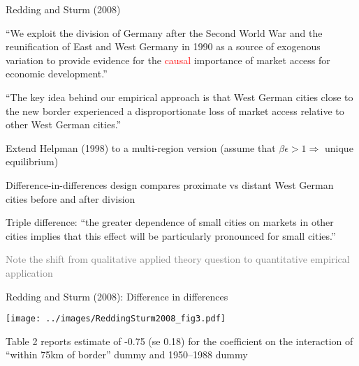 \documentclass[11pt,notes=hide,aspectratio=169]{beamer}
\begin{document}
\begin{frame}{Redding and Sturm (2008)}
\begin{itemize}
{\small
	\item ``We exploit the division of Germany after the Second World War and the reunification of East and West Germany in 1990 as a source of exogenous variation to provide evidence for the \textcolor{red}{causal} importance of market access for economic development.''
	\item ``The key idea behind our empirical approach is that West German cities close to the new border experienced a disproportionate loss of market access relative to other West German cities.''
	\item Extend Helpman (1998) to a multi-region version (assume that $\beta\epsilon>1 \Rightarrow$ unique equilibrium)
	\item Difference-in-differences design compares proximate vs distant West German cities before and after division
	\item Triple difference: ``the greater dependence of small cities on markets in other cities implies that this effect will be particularly pronounced for small cities.''
	\item[] \textcolor{gray}{Note the shift from qualitative applied theory question to quantitative empirical application}
\par}
\end{itemize}
\end{frame}
\begin{frame}{Redding and Sturm (2008): Difference in differences}
\begin{center}
\texttt{[image: ../images/ReddingSturm2008\_fig3.pdf]}
\end{center}
{\small Table 2 reports estimate of -0.75 (se 0.18) for the coefficient on the interaction of ``within 75km of border'' dummy and 1950--1988 dummy\par}
\end{frame}
\end{document}

